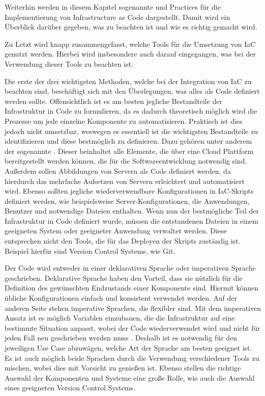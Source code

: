 \documentclass[biblatex]{lni}
\begin{document}
Weiterhin werden in diesem Kapitel sogenannte  und  Practices für die Implementierung von Infrastructure as Code dargestellt. Damit wird ein Überblick darüber gegeben, was zu beachten ist und wie es richtig gemacht wird.

Zu Letzt wird knapp zusammengefasst, welche Tools für die Umsetzung von IaC genutzt werden. Hierbei wird insbesondere auch darauf eingegangen, was bei der Verwendung dieser Tools zu beachten ist.

Die erste der drei wichtigsten Methoden, welche bei der Integration von IaC zu beachten sind, beschäftigt sich mit den Überlegungen, was alles als Code definiert werden sollte. Offensichtlich ist es am besten jegliche Bestandteile der Infrastruktur in Code zu formulieren, da es dadurch theoretisch möglich wird die Prozesse um jede einzelne Komponente zu automatisieren. Praktisch ist dies jedoch nicht umsetzbar, weswegen es essentiell ist die wichtigsten Bestandteile zu identifizieren und diese bestmöglich zu definieren. Dazu gehören unter anderem der sogenannte . Dieser beinhaltet alle Elemente, die über eine Cloud Plattform bereitgestellt werden können, die für die Softwareentwicklung notwendig sind. Außerdem sollen Abbildungen von Servern als Code definiert werden, da hierdurch das mehrfache Aufsetzen von Servern erleichtert und automatisiert wird. Ebenso sollten jegliche wiederverwendbare Konfigurationen in IaC-Skripts definiert werden, wie beispielsweise Server-Konfigurationen, die Anwendungen, Benutzer und notwendige Dateien enthalten. Wenn nun der bestmögliche Teil der Infrastruktur in Code definiert wurde, müssen die entstandenen Dateien in einem geeigneten System oder geeigneter Anwendung verwaltet werden. Diese entsprechen nicht den Tools, die für das Deployen der Skripts zuständig ist. Beispiel hierfür sind Version Control Systems, wie Git. 

Der Code wird entweder in einer deklarativen Sprache oder imperativen Sprache geschrieben. Deklarative Sprache haben den Vorteil, dass sie nützlich für die Definition des gewünschten Endzustands einer Komponente sind. Hiermit können übliche Konfigurationen einfach und konsistent verwendet werden. Auf der anderen Seite stehen imperative Sprachen, die flexibler sind. Mit dem imperativen Ansatz ist es möglich Variablen einzubauen, die die Infrastruktur auf eine bestimmte Situation anpasst, wobei der Code wiederverwendet wird und nicht für jeden Fall neu geschrieben werden muss \cite{Morris.December2020}. Deshalb ist es notwendig für den jeweiligen Use Case abzuwägen, welche Art der Sprache am besten geeignet ist. Es ist auch möglich beide Sprachen durch die Verwendung verschiedener Tools zu mischen, wobei dies mit Vorsicht zu genießen ist. Ebenso stellen die richtige Auswahl der Komponenten und Systeme eine große Rolle, wie auch die Auswahl eines geeigneten Version Control Systems. 
\end{document}
